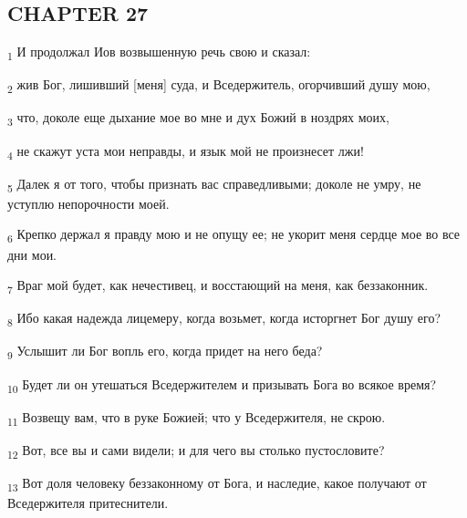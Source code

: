 \subsection{CHAPTER 27}
\begin{tcolorbox}
\textsubscript{1} И продолжал Иов возвышенную речь свою и сказал:
\end{tcolorbox}
\begin{tcolorbox}
\textsubscript{2} жив Бог, лишивший [меня] суда, и Вседержитель, огорчивший душу мою,
\end{tcolorbox}
\begin{tcolorbox}
\textsubscript{3} что, доколе еще дыхание мое во мне и дух Божий в ноздрях моих,
\end{tcolorbox}
\begin{tcolorbox}
\textsubscript{4} не скажут уста мои неправды, и язык мой не произнесет лжи!
\end{tcolorbox}
\begin{tcolorbox}
\textsubscript{5} Далек я от того, чтобы признать вас справедливыми; доколе не умру, не уступлю непорочности моей.
\end{tcolorbox}
\begin{tcolorbox}
\textsubscript{6} Крепко держал я правду мою и не опущу ее; не укорит меня сердце мое во все дни мои.
\end{tcolorbox}
\begin{tcolorbox}
\textsubscript{7} Враг мой будет, как нечестивец, и восстающий на меня, как беззаконник.
\end{tcolorbox}
\begin{tcolorbox}
\textsubscript{8} Ибо какая надежда лицемеру, когда возьмет, когда исторгнет Бог душу его?
\end{tcolorbox}
\begin{tcolorbox}
\textsubscript{9} Услышит ли Бог вопль его, когда придет на него беда?
\end{tcolorbox}
\begin{tcolorbox}
\textsubscript{10} Будет ли он утешаться Вседержителем и призывать Бога во всякое время?
\end{tcolorbox}
\begin{tcolorbox}
\textsubscript{11} Возвещу вам, что в руке Божией; что у Вседержителя, не скрою.
\end{tcolorbox}
\begin{tcolorbox}
\textsubscript{12} Вот, все вы и сами видели; и для чего вы столько пустословите?
\end{tcolorbox}
\begin{tcolorbox}
\textsubscript{13} Вот доля человеку беззаконному от Бога, и наследие, какое получают от Вседержителя притеснители.
\end{tcolorbox}
